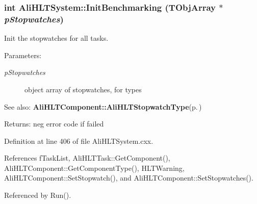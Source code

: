 \subsubsection{\setlength{\rightskip}{0pt plus 5cm}int Ali\-HLTSystem::Init\-Benchmarking (TObj\-Array $\ast$ {\em p\-Stopwatches})}\label{classAliHLTSystem_a15}


Init the stopwatches for all tasks. \begin{Desc}
\item[Parameters:]
\begin{description}
\item[{\em p\-Stopwatches}]object array of stopwatches, for types \end{description}
\end{Desc}
\begin{Desc}
\item[See also:]{\bf Ali\-HLTComponent::Ali\-HLTStopwatch\-Type}{\rm (p.\,\pageref{classAliHLTComponent_w10})} \end{Desc}
\begin{Desc}
\item[Returns:]neg error code if failed \end{Desc}


Definition at line 406 of file Ali\-HLTSystem.cxx.

References f\-Task\-List, Ali\-HLTTask::Get\-Component(), Ali\-HLTComponent::Get\-Component\-Type(), HLTWarning, Ali\-HLTComponent::Set\-Stopwatch(), and Ali\-HLTComponent::Set\-Stopwatches().

Referenced by Run().

